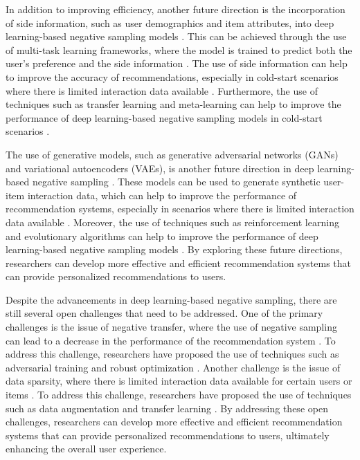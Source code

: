 \documentclass[11pt,a4paper]{article}
\begin{document}
In addition to improving efficiency, another future direction is the incorporation of side information, such as user demographics and item attributes, into deep learning-based negative sampling models \cite{doi:10.1109/access.2023.3343522}. This can be achieved through the use of multi-task learning frameworks, where the model is trained to predict both the user's preference and the side information \cite{arxiv:2206.04415}. The use of side information can help to improve the accuracy of recommendations, especially in cold-start scenarios where there is limited interaction data available \cite{doi:10.1609/aaai.v35i5.16601}. Furthermore, the use of techniques such as transfer learning and meta-learning can help to improve the performance of deep learning-based negative sampling models in cold-start scenarios \cite{doi:10.1109/tkde.2022.3168775}.

The use of generative models, such as generative adversarial networks (GANs) and variational autoencoders (VAEs), is another future direction in deep learning-based negative sampling \cite{doi:10.1145/3511808.3557335}. These models can be used to generate synthetic user-item interaction data, which can help to improve the performance of recommendation systems, especially in scenarios where there is limited interaction data available \cite{doi:10.1016/j.patrec.2022.04.001}. Moreover, the use of techniques such as reinforcement learning and evolutionary algorithms can help to improve the performance of deep learning-based negative sampling models \cite{arxiv:2009.03376}. By exploring these future directions, researchers can develop more effective and efficient recommendation systems that can provide personalized recommendations to users.

Despite the advancements in deep learning-based negative sampling, there are still several open challenges that need to be addressed. One of the primary challenges is the issue of negative transfer, where the use of negative sampling can lead to a decrease in the performance of the recommendation system \cite{doi:10.1109/jas.2022.106004}. To address this challenge, researchers have proposed the use of techniques such as adversarial training and robust optimization \cite{arxiv:2205.04701}. Another challenge is the issue of data sparsity, where there is limited interaction data available for certain users or items \cite{doi:10.18653/v1/2023.findings-acl.362}. To address this challenge, researchers have proposed the use of techniques such as data augmentation and transfer learning \cite{doi:10.1145/3637528.3671692}. By addressing these open challenges, researchers can develop more effective and efficient recommendation systems that can provide personalized recommendations to users, ultimately enhancing the overall user experience.
\end{document}
